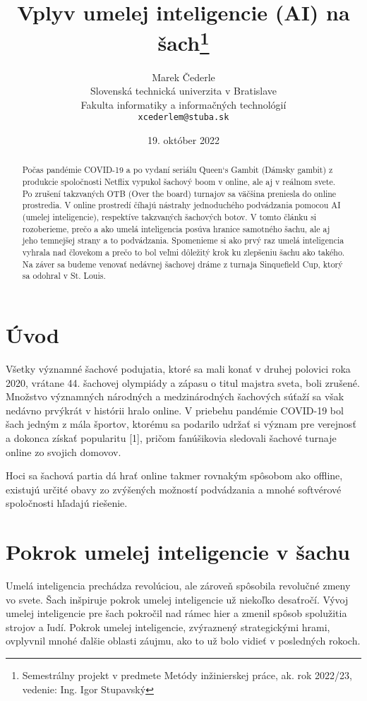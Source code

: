 \documentclass[10pt,twoside,slovak,a4paper]{article}
\title{Vplyv umelej inteligencie (AI) na šach\thanks{Semestrálny projekt v predmete Metódy inžinierskej práce, ak. rok 2022/23, vedenie: Ing. Igor Stupavský }} %
\author{Marek Čederle\\[2pt]
	{\small Slovenská technická univerzita v Bratislave}\\
	{\small Fakulta informatiky a informačných technológií}\\
	{\small \texttt{xcederlem@stuba.sk}}
	}
\date{\small 19. október 2022}
\begin{document}
\maketitle

\begin{abstract}
Počas pandémie COVID-19 a po vydaní seriálu Queen‘s Gambit (Dámsky gambit) z produkcie spoločnosti Netflix vypukol šachový boom v online, ale aj v reálnom svete. Po zrušení takzvaných OTB (Over the board) turnajov sa väčšina preniesla do online prostredia. V online prostredí číhajú nástrahy jednoduchého podvádzania pomocou AI (umelej inteligencie), respektíve takzvaných šachových botov. V tomto článku si rozoberieme, prečo a ako umelá inteligencia posúva hranice samotného šachu, ale aj jeho temnejšej strany a to podvádzania. Spomenieme si ako prvý raz umelá inteligencia vyhrala nad človekom a prečo to bol veľmi dôležitý krok ku zlepšeniu šachu ako takého. Na záver sa budeme venovať nedávnej šachovej dráme z turnaja Sinquefield Cup, ktorý sa odohral v St. Louis.
\end{abstract}





\section{Úvod}

Všetky významné šachové podujatia, ktoré sa mali konať v druhej polovici roka 2020, vrátane 44. šachovej olympiády a zápasu o titul majstra sveta, boli zrušené. Množstvo významných národných a medzinárodných šachových súťaží sa však nedávno prvýkrát v histórii hralo online. V priebehu pandémie COVID-19 bol šach jedným z mála športov, ktorému sa podarilo udržať si význam pre verejnosť a dokonca získať popularitu [1], pričom fanúšikovia sledovali šachové turnaje online zo svojich domovov.

Hoci sa šachová partia dá hrať online takmer rovnakým spôsobom ako offline, existujú určité obavy zo zvýšených možností podvádzania a mnohé softvérové spoločnosti hľadajú riešenie.
\cite{IM20}





\section{Pokrok umelej inteligencie v šachu}

Umelá inteligencia prechádza revolúciou, ale zároveň spôsobila revolučné zmeny vo svete. Šach inšpiruje pokrok umelej inteligencie už niekoľko desaťročí. Vývoj umelej inteligencie pre šach pokročil nad rámec hier a zmenil spôsob spolužitia strojov a ľudí. Pokrok umelej inteligencie, zvýraznený strategickými hrami, ovplyvnil mnohé ďalšie oblasti záujmu, ako to už bolo vidieť v posledných rokoch.
\end{document}
